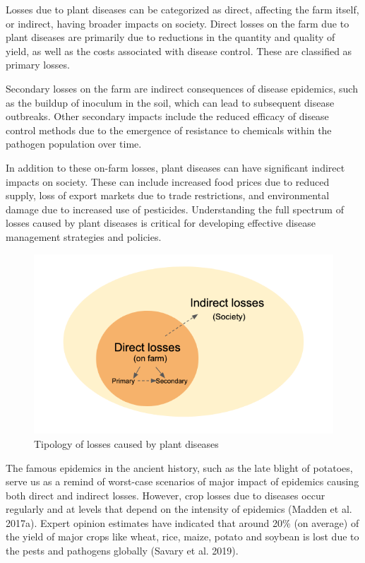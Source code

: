 \documentclass[
  letterpaper,
  DIV=11,
  numbers=noendperiod]{scrreprt}
\begin{document}
Losses due to plant diseases can be categorized as direct, affecting the
farm itself, or indirect, having broader impacts on society. Direct
losses on the farm due to plant diseases are primarily due to reductions
in the quantity and quality of yield, as well as the costs associated
with disease control. These are classified as primary losses.

Secondary losses on the farm are indirect consequences of disease
epidemics, such as the buildup of inoculum in the soil, which can lead
to subsequent disease outbreaks. Other secondary impacts include the
reduced efficacy of disease control methods due to the emergence of
resistance to chemicals within the pathogen population over time.

In addition to these on-farm losses, plant diseases can have significant
indirect impacts on society. These can include increased food prices due
to reduced supply, loss of export markets due to trade restrictions, and
environmental damage due to increased use of pesticides. Understanding
the full spectrum of losses caused by plant diseases is critical for
developing effective disease management strategies and policies.

\begin{figure}

{\centering \includegraphics[width=5.96875in,height=\textheight]{imgs/loss_diagram.png}

}

\caption{\label{fig-losses}Tipology of losses caused by plant diseases}

\end{figure}

The famous epidemics in the ancient history, such as the late blight of
potatoes, serve us as a remind of worst-case scenarios of major impact
of epidemics causing both direct and indirect losses. However, crop
losses due to diseases occur regularly and at levels that depend on the
intensity of epidemics (Madden et al. 2017a). Expert opinion estimates
have indicated that around 20\% (on average) of the yield of major crops
like wheat, rice, maize, potato and soybean is lost due to the pests and
pathogens globally (Savary et al. 2019).
\end{document}
